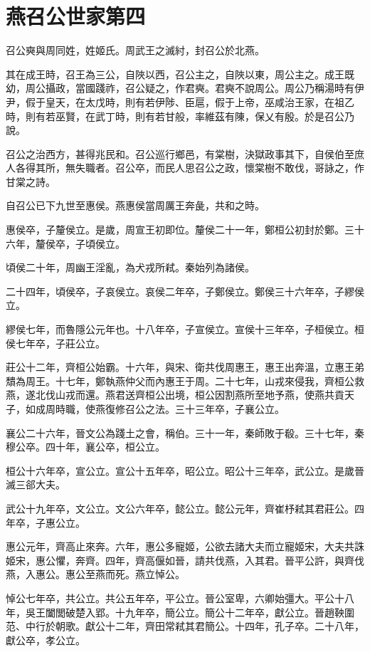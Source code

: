 \chapter{燕召公世家第四}

召公奭與周同姓，姓姬氏。周武王之滅紂，封召公於北燕。

其在成王時，召王為三公，自陜以西，召公主之，自陜以東，周公主之。成王既幼，周公攝政，當國踐祚，召公疑之，作君奭。君奭不說周公。周公乃稱湯時有伊尹，假于皇天，在太戊時，則有若伊陟、臣扈，假于上帝，巫咸治王家，在祖乙時，則有若巫賢，在武丁時，則有若甘般，率維茲有陳，保乂有殷。於是召公乃說。

召公之治西方，甚得兆民和。召公巡行鄉邑，有棠樹，決獄政事其下，自侯伯至庶人各得其所，無失職者。召公卒，而民人思召公之政，懷棠樹不敢伐，哥詠之，作甘棠之詩。

自召公已下九世至惠侯。燕惠侯當周厲王奔彘，共和之時。

惠侯卒，子釐侯立。是歲，周宣王初即位。釐侯二十一年，鄭桓公初封於鄭。三十六年，釐侯卒，子頃侯立。

頃侯二十年，周幽王淫亂，為犬戎所弒。秦始列為諸侯。

二十四年，頃侯卒，子哀侯立。哀侯二年卒，子鄭侯立。鄭侯三十六年卒，子繆侯立。

繆侯七年，而魯隱公元年也。十八年卒，子宣侯立。宣侯十三年卒，子桓侯立。桓侯七年卒，子莊公立。

莊公十二年，齊桓公始霸。十六年，與宋、衛共伐周惠王，惠王出奔溫，立惠王弟穨為周王。十七年，鄭執燕仲父而內惠王于周。二十七年，山戎來侵我，齊桓公救燕，遂北伐山戎而還。燕君送齊桓公出境，桓公因割燕所至地予燕，使燕共貢天子，如成周時職，使燕復修召公之法。三十三年卒，子襄公立。

襄公二十六年，晉文公為踐土之會，稱伯。三十一年，秦師敗于殽。三十七年，秦穆公卒。四十年，襄公卒，桓公立。

桓公十六年卒，宣公立。宣公十五年卒，昭公立。昭公十三年卒，武公立。是歲晉滅三郤大夫。

武公十九年卒，文公立。文公六年卒，懿公立。懿公元年，齊崔杼弒其君莊公。四年卒，子惠公立。

惠公元年，齊高止來奔。六年，惠公多寵姬，公欲去諸大夫而立寵姬宋，大夫共誅姬宋，惠公懼，奔齊。四年，齊高偃如晉，請共伐燕，入其君。晉平公許，與齊伐燕，入惠公。惠公至燕而死。燕立悼公。

悼公七年卒，共公立。共公五年卒，平公立。晉公室卑，六卿始彊大。平公十八年，吳王闔閭破楚入郢。十九年卒，簡公立。簡公十二年卒，獻公立。晉趙鞅圍范、中行於朝歌。獻公十二年，齊田常弒其君簡公。十四年，孔子卒。二十八年，獻公卒，孝公立。

